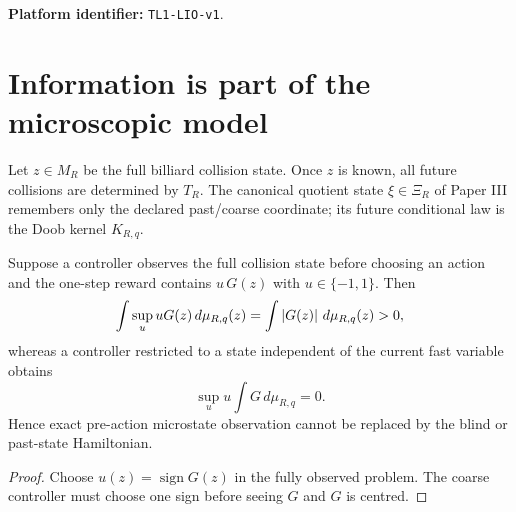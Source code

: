
\begin{abstract}
We extend the fixed-law theta-semigroup of Paper III to controlled and
partially observed values without confusing deterministic microscopic
predictability with coarse statistical uncertainty.  A complete Sinai
collision state determines the future orbit; a nontrivial dynamic program
arises only after the information state forgets stable/future coordinates or
introduces a declared hidden subsystem.  We formulate an exact-observation
no-go theorem and keep the canonical past-state kernel as the base sufficient
statistic.

For controls acting on the slow drift and work, but not on the fast billiard
geometry or current preparation, the limiting risk-sensitive Isaacs equation
retains the billiard-derived coefficients $D_{R,q}$ and $q$.  Quadratic actuator
energies yield a unique pure saddle on closed, possibly noncompact, convex
control sets.  A second-order saddle-envelope theorem shows that terminal
second variations contain both the fixed-policy covariance and an
optimizer-response Schur complement.  This closes the type gap between
fixed-law tangent theory and controlled theta-games.  A deterministic
refresh--autoregressive product extension supplies a separate soft-filter
branch; exact high-rate pre-action observation is classified by a no-go
result rather than silently collapsed.
\end{abstract}
\maketitle
\noindent\textbf{Platform identifier:} \texttt{TL1-LIO-v1}.

\tableofcontents

\section{Information is part of the microscopic model}\label{sec:information}
Let $z\in M_R$ be the full billiard collision state.  Once $z$ is known, all
future collisions are determined by $T_R$.  The canonical quotient state
$\xi\in\Xi_R$ of Paper III remembers only the declared past/coarse coordinate;
its future conditional law is the Doob kernel $K_{R,q}$.

\begin{theorem}\label{thm:full-no-go}
Suppose a controller observes the full collision state before choosing an
action and the one-step reward contains $u\,G(z)$ with
$u\in\{-1,1\}$.  Then
\[
 \int\sup_u uG(z)\,d\mu_{R,q}(z)
 =\int\left\lvert G(z)\right\rvert\,d\mu_{R,q}(z)>0,
\]
whereas a controller restricted to a state independent of the current fast
variable obtains
\[
 \sup_u u\int G\,d\mu_{R,q}=0.
\]
Hence exact pre-action microstate observation cannot be replaced by the blind
or past-state Hamiltonian.
\end{theorem}
\begin{proof}
Choose $u(z)=\operatorname{sign}G(z)$ in the fully observed problem.  The
coarse controller must choose one sign before seeing $G$ and $G$ is centred.
\end{proof}

